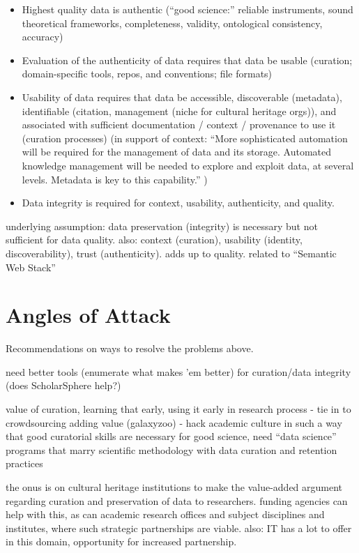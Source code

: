 \documentclass{acm_proc_article-sp}
\begin{document}
\begin{itemize}
\item Highest quality data is authentic (``good science:'' reliable
  instruments, sound theoretical frameworks, completeness, validity,
  ontological consistency, accuracy)
\item Evaluation of the authenticity of data requires that data be usable
  (curation; domain-specific tools, repos, and conventions; file formats)
\item Usability of data requires that data be accessible, discoverable
  (metadata), identifiable (citation, management (niche for cultural
  heritage orgs)), and associated with sufficient documentation /
  context / provenance to use it (curation processes) (in support of
  context: ``More sophisticated automation will be required for the
  management of data and its storage. Automated knowledge management
  will be needed to explore and exploit data, at several
  levels. Metadata is key to this capability.'' \cite{jisc:deluge})
\item Data integrity is required for context, usability, authenticity, and
  quality.
\end{itemize}

underlying assumption: data preservation (integrity) is necessary but not
sufficient for data quality. also: context (curation), usability (identity,
discoverability), trust (authenticity). adds up to quality. related to
``Semantic Web Stack''

\section{Angles of Attack}
Recommendations on ways to resolve the problems above.

need better tools (enumerate what makes 'em better) for curation/data
integrity (does ScholarSphere help?)

value of curation, learning that early, using it early in research process -
tie in to crowdsourcing adding value (galaxyzoo) - hack academic culture in
such a way that good curatorial skills are necessary for good science, need
``data science'' programs that marry scientific methodology with data curation
and retention practices

the onus is on cultural heritage institutions to make the value-added
argument regarding curation and preservation of data to researchers.
funding agencies can help with this, as can academic research offices
and subject disciplines and institutes, where such strategic
partnerships are viable.  also: IT has a lot to offer in this domain,
opportunity for increased partnership.
\end{document}
